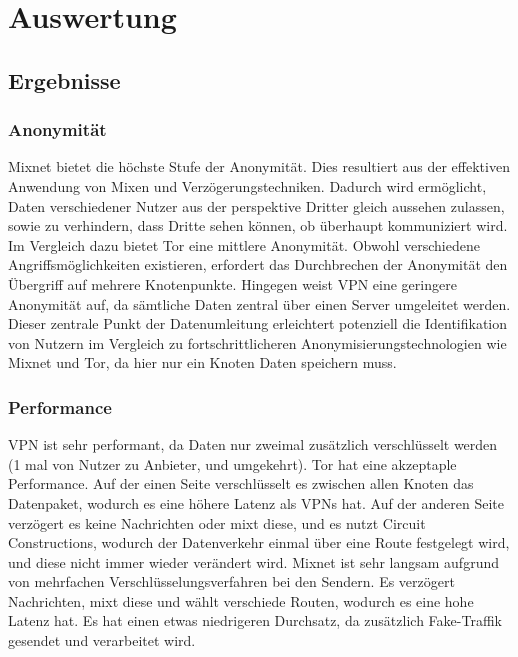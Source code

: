\section{Auswertung}

\subsection{Ergebnisse}

\subsubsection{Anonymität}

Mixnet bietet die höchste Stufe der Anonymität. Dies resultiert aus der effektiven Anwendung von Mixen und Verzögerungstechniken. Dadurch wird ermöglicht, Daten verschiedener Nutzer aus der perspektive Dritter gleich aussehen zulassen, sowie zu verhindern, dass Dritte sehen können, ob überhaupt kommuniziert wird.
Im Vergleich dazu bietet Tor eine mittlere Anonymität. Obwohl verschiedene Angriffsmöglichkeiten existieren, erfordert das Durchbrechen der Anonymität den Übergriff auf mehrere Knotenpunkte. 
Hingegen weist VPN eine geringere Anonymität auf, da sämtliche Daten zentral über einen Server umgeleitet werden. Dieser zentrale Punkt der Datenumleitung erleichtert potenziell die Identifikation von Nutzern im Vergleich zu fortschrittlicheren Anonymisierungstechnologien wie Mixnet und Tor, da hier nur ein Knoten Daten speichern muss.

\subsubsection{Performance}

VPN ist sehr performant, da Daten nur zweimal zusätzlich verschlüsselt werden (1 mal von Nutzer zu Anbieter, und umgekehrt).
Tor hat eine akzeptaple Performance. Auf der einen Seite verschlüsselt es zwischen allen Knoten das Datenpaket, wodurch es eine höhere Latenz als VPNs hat. Auf der anderen Seite verzögert es keine Nachrichten oder mixt diese, und es nutzt Circuit Constructions, wodurch der Datenverkehr einmal über eine Route festgelegt wird, und diese nicht immer wieder verändert wird.
Mixnet ist sehr langsam aufgrund von mehrfachen Verschlüsselungsverfahren bei den Sendern. Es verzögert Nachrichten, mixt diese und wählt verschiede Routen, wodurch es eine hohe Latenz hat. Es hat einen etwas niedrigeren Durchsatz, da zusätzlich Fake-Traffik gesendet und verarbeitet wird.

